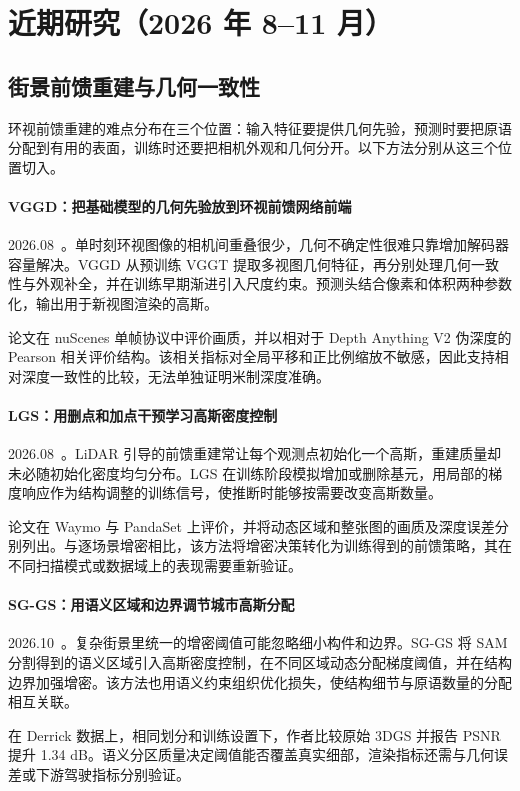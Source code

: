 \section{近期研究（2026 年 8--11 月）}
\subsection{街景前馈重建与几何一致性}

环视前馈重建的难点分布在三个位置：输入特征要提供几何先验，预测时要把原语分配到有用的表面，训练时还要把相机外观和几何分开。以下方法分别从这三个位置切入。

\paragraph{VGGD：把基础模型的几何先验放到环视前馈网络前端}
2026.08~\cite{2608_10682}。单时刻环视图像的相机间重叠很少，几何不确定性很难只靠增加解码器容量解决。VGGD 从预训练 VGGT 提取多视图几何特征，再分别处理几何一致性与外观补全，并在训练早期渐进引入尺度约束。预测头结合像素和体积两种参数化，输出用于新视图渲染的高斯。

论文在 nuScenes 单帧协议中评价画质，并以相对于 Depth Anything V2 伪深度的 Pearson 相关评价结构。该相关指标对全局平移和正比例缩放不敏感，因此支持相对深度一致性的比较，无法单独证明米制深度准确。

\paragraph{LGS：用删点和加点干预学习高斯密度控制}
2026.08~\cite{2608_11077}。LiDAR 引导的前馈重建常让每个观测点初始化一个高斯，重建质量却未必随初始化密度均匀分布。LGS 在训练阶段模拟增加或删除基元，用局部的梯度响应作为结构调整的训练信号，使推断时能够按需要改变高斯数量。

论文在 Waymo 与 PandaSet 上评价，并将动态区域和整张图的画质及深度误差分别列出。与逐场景增密相比，该方法将增密决策转化为训练得到的前馈策略，其在不同扫描模式或数据域上的表现需要重新验证。

\paragraph{SG-GS：用语义区域和边界调节城市高斯分配}
2026.10~\cite{2610_16292}。复杂街景里统一的增密阈值可能忽略细小构件和边界。SG-GS 将 SAM 分割得到的语义区域引入高斯密度控制，在不同区域动态分配梯度阈值，并在结构边界加强增密。该方法也用语义约束组织优化损失，使结构细节与原语数量的分配相互关联。

在 Derrick 数据上，相同划分和训练设置下，作者比较原始 3DGS 并报告 PSNR 提升 1.34 dB。语义分区质量决定阈值能否覆盖真实细部，渲染指标还需与几何误差或下游驾驶指标分别验证。

